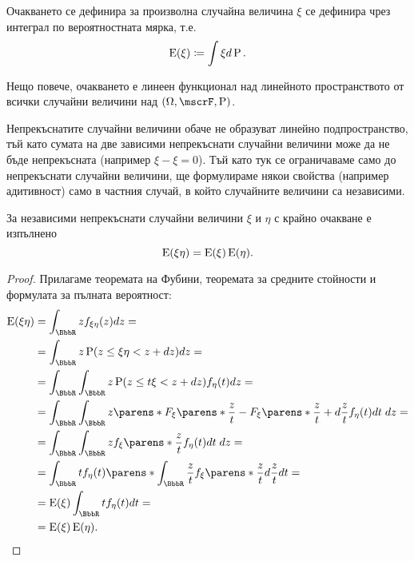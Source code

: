 \documentclass{../../common/topic}
\begin{document}
\begin{remark}
  Очакването се дефинира за произволна случайна величина \( \xi \) се дефинира чрез интеграл по вероятностната мярка, т.е.
  \begin{equation*}
    \operatorname{E}(\xi) \coloneqq \int \xi d\operatorname{P}.
  \end{equation*}

  Нещо повече, очакването е линеен функционал над линейното пространството от всички случайни величини над \( (\Omega, \mscrF, \Prob) \).

  Непрекъснатите случайни величини обаче не образуват линейно подпространство, тъй като сумата на две зависими непрекъснати случайни величини може да не бъде непрекъсната (например \( \xi - \xi = 0 \)). Тъй като тук се ограничаваме само до непрекъснати случайни величини, ще формулираме някои свойства (например адитивност) само в частния случай, в който случайните величини са независими.
\end{remark}

\begin{proposition}\label{thm:expectation_of_independent_product}
  За независими непрекъснати случайни величини \( \xi \) и \( \eta \) с крайно очакване е изпълнено
  \begin{equation*}
    \operatorname{E}(\xi \eta) = \operatorname{E}(\xi) \operatorname{E}(\eta).
  \end{equation*}
\end{proposition}
\begin{proof}
  Прилагаме теоремата на Фубини, теоремата за средните стойности и формулата за пълната вероятност:
  \begin{align*}
    \Expect(\xi \eta)
    &=
    \int_{\BbbR} z f_{\xi \eta}(z) dz
    = \\ &=
    \int_{\BbbR} z \Prob(z \leq \xi \eta < z + dz) dz
    = \\ &=
    \int_{\BbbR} \int_{\BbbR} z \Prob(z \leq t \xi < z + dz) f_\eta(t) dz
    = \\ &=
    \int_{\BbbR} \int_{\BbbR} z \parens*{ F_\xi\parens*{\frac z t } - F_\xi\parens*{\frac z t + d\frac z t } } f_\eta(t) dt \; dz
    = \\ &=
    \int_{\BbbR} \int_{\BbbR} z f_\xi \parens*{\frac z t } f_\eta(t) dt \; dz
    = \\ &=
    \int_{\BbbR} t f_\eta(t) \parens*{\int_{\BbbR} \frac z t f_\xi \parens*{\frac z t } d\frac z t } dt
    = \\ &=
    \Expect(\xi) \int_{\BbbR} t f_\eta(t) dt
    = \\ &=
    \Expect(\xi) \Expect(\eta).
  \end{align*}
\end{proof}
\end{document}

